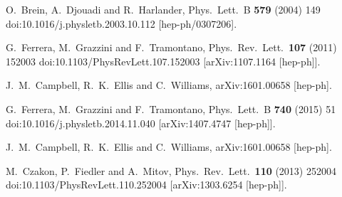  O.~Brein, A.~Djouadi and R.~Harlander,
  Phys.\ Lett.\ B {\bf 579} (2004) 149
  doi:10.1016/j.physletb.2003.10.112
  [hep-ph/0307206].



  G.~Ferrera, M.~Grazzini and F.~Tramontano,
  Phys.\ Rev.\ Lett.\  {\bf 107} (2011) 152003
  doi:10.1103/PhysRevLett.107.152003
  [arXiv:1107.1164 [hep-ph]].


  J.~M.~Campbell, R.~K.~Ellis and C.~Williams,
  arXiv:1601.00658 [hep-ph].


  G.~Ferrera, M.~Grazzini and F.~Tramontano,
  Phys.\ Lett.\ B {\bf 740} (2015) 51
  doi:10.1016/j.physletb.2014.11.040
  [arXiv:1407.4747 [hep-ph]].

  J.~M.~Campbell, R.~K.~Ellis and C.~Williams,
  arXiv:1601.00658 [hep-ph].



  M.~Czakon, P.~Fiedler and A.~Mitov,
  Phys.\ Rev.\ Lett.\  {\bf 110} (2013) 252004
  doi:10.1103/PhysRevLett.110.252004
  [arXiv:1303.6254 [hep-ph]].

